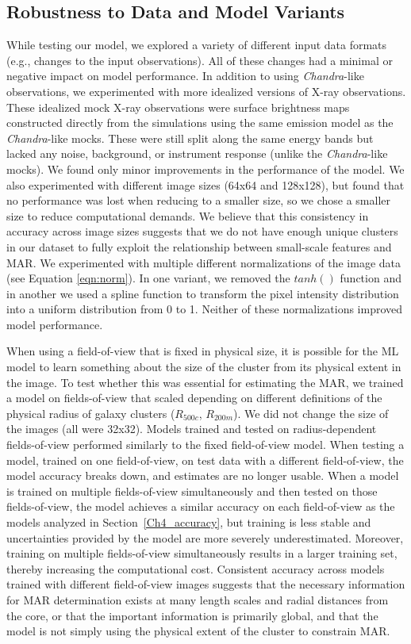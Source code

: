 \subsection{Robustness to Data and Model Variants}\label{Ch4_data_robustness}
While testing our model, we explored a variety of different input data formats (e.g., changes to the input observations). All of these changes had a minimal or negative impact on model performance. In addition to using \textit{Chandra}-like observations, we experimented with more idealized versions of X-ray observations. These idealized mock X-ray observations were surface brightness maps constructed directly from the simulations using the same emission model as the {\it Chandra}-like mocks. These were still split along the same energy bands but lacked any noise, background, or instrument response (unlike the \textit{Chandra}-like mocks). We found only minor improvements in the performance of the model. We also experimented with different image sizes (64x64 and 128x128), but found that no performance was lost when reducing to a smaller size, so we chose a smaller size to reduce computational demands. We believe that this consistency in accuracy across image sizes suggests that we do not have enough unique clusters in our dataset to fully exploit the relationship between small-scale features and MAR. We experimented with multiple different normalizations of the image data (see Equation \ref{eqn:norm}). In one variant, we removed the $tanh()$ function and in another we used a spline function to transform the pixel intensity distribution into a uniform distribution from 0 to 1. Neither of these normalizations improved model performance. 

When using a field-of-view that is fixed in physical size, it is possible for the ML model to learn something about the size of the cluster from its physical extent in the image. To test whether this was essential for estimating the MAR, we trained a model on fields-of-view that scaled depending on different definitions of the physical radius of galaxy clusters ($R_{500c}$, $R_{200m}$). We did not change the size of the images (all were 32x32). Models trained and tested on radius-dependent fields-of-view performed similarly to the fixed field-of-view model. When testing a model, trained on one field-of-view, on test data with a different field-of-view, the model accuracy breaks down, and estimates are no longer usable. When a model is trained on multiple fields-of-view simultaneously and then tested on those fields-of-view, the model achieves a similar accuracy on each field-of-view as the models analyzed in Section~\ref{Ch4_accuracy}, but training is less stable and uncertainties provided by the model are more severely underestimated. Moreover, training on multiple fields-of-view simultaneously results in a larger training set, thereby increasing the computational cost. Consistent accuracy across models trained with different field-of-view images suggests that the necessary information for MAR determination exists at many length scales and radial distances from the core, or that the important information is primarily global, and that the model is not simply using the physical extent of the cluster to constrain MAR.

